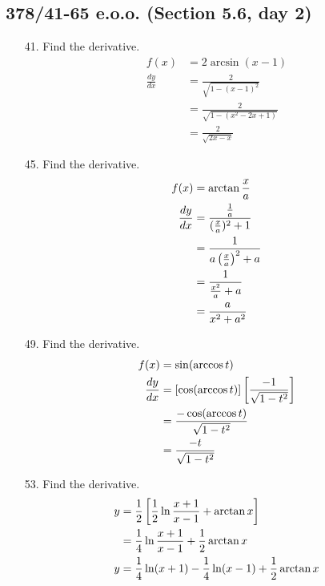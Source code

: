 \documentclass[11pt]{article}
\begin{document}
\subsection{378/41-65 e.o.o. (Section 5.6, day 2)}
\begin{enumerate}
	\item[41. ] Find the derivative.
		\begin{align}
			f(x) &= 2 \arcsin (x-1) \\
			\frac{dy}{dx} &= \frac{2}{\sqrt{1-(x-1)^2}} \\
			&= \frac{2}{\sqrt{1-(x^2-2x+1)}} \\
			&= \frac{2}{\sqrt{2x-x}}
		\end{align}
	\item[45. ] Find the derivative.
		\begin{align}
			\setcounter{equation}{0}
			f(x) &= \arctan \frac{x}{a} \\ %
			\frac{dy}{dx} &= \frac{\frac{1}{a}}{(\frac{x}{a})^2+1} \\
			&= \frac{1}{a\left(\frac{x}{a}\right)^2+a} \\
			&= \frac{1}{\frac{x^2}{a}+a} \\
			&= \frac{a}{x^2+a^2}
		\end{align}
	\item[49. ] Find the derivative.
		\begin{align}
			\setcounter{equation}{0}
			f(x) &= \sin (\arccos t) \\
			\frac{dy}{dx} &= \left[\cos (\arccos t)\right] 
			\left[\frac{-1}{\sqrt{1-t^2}}\right] \\
			&= \frac{-\cos(\arccos t)}{\sqrt{1-t^2}} \\
			&= \frac{-t}{\sqrt{1-t^2}}
		\end{align}
	\item[53. ] Find the derivative.
		\begin{align}
			\setcounter{equation}{0}
			y &= \frac{1}{2}\left[\frac{1}{2}\ln\frac{x+1}{x-1}+\arctan x\right] \\
			&= \frac{1}{4}\ln\frac{x+1}{x-1}+\frac{1}{2}\arctan x \\ 
			y &= \frac{1}{4}\ln (x+1) - \frac{1}{4}\ln (x-1) + \frac{1}{2}\arctan x\\

\end{align}
\end{enumerate}
\end{document}

